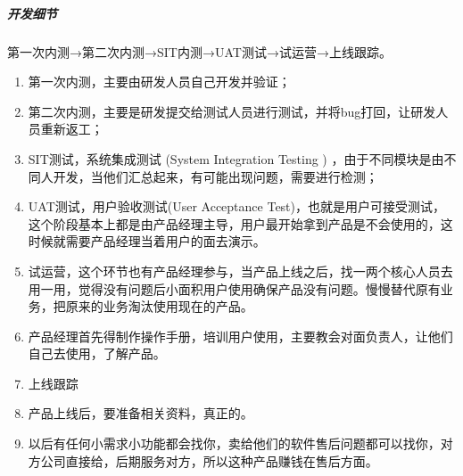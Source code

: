\documentclass[letterpaper,10pt,english]{sphinxmanual}
\begin{document}
\subparagraph{开发细节}
\label{\detokenize{chapter_knowledge/project_manage:id6}}
第一次内测→第二次内测→SIT内测→UAT测试→试运营→上线跟踪。
%
\begin{footnote}[648]\sphinxAtStartFootnote
{}
%
\end{footnote}
\begin{enumerate}
%
\item {} 
第一次内测，主要由研发人员自己开发并验证；

\item {} 
第二次内测，主要是研发提交给测试人员进行测试，并将bug打回，让研发人员重新返工；

\item {} 
SIT测试，系统集成测试 (System Integration Testing )
，由于不同模块是由不同人开发，当他们汇总起来，有可能出现问题，需要进行检测；

\item {} 
UAT测试，用户验收测试(User Acceptance
Test)，也就是用户可接受测试，这个阶段基本上都是由产品经理主导，用户最开始拿到产品是不会使用的，这时候就需要产品经理当着用户的面去演示。

\item {} 
试运营，这个环节也有产品经理参与，当产品上线之后，找一两个核心人员去用一用，觉得没有问题后小面积用户使用确保产品没有问题。慢慢替代原有业务，把原来的业务淘汰使用现在的产品。

\item {} 
产品经理首先得制作操作手册，培训用户使用，主要教会对面负责人，让他们自己去使用，了解产品。

\item {} 
上线跟踪

\item {} 
产品上线后，要准备相关资料，真正的。

\item {} 
以后有任何小需求小功能都会找你，卖给他们的软件售后问题都可以找你，对方公司直接给，后期服务对方，所以这种产品赚钱在售后方面。

\end{enumerate}
\end{document}
